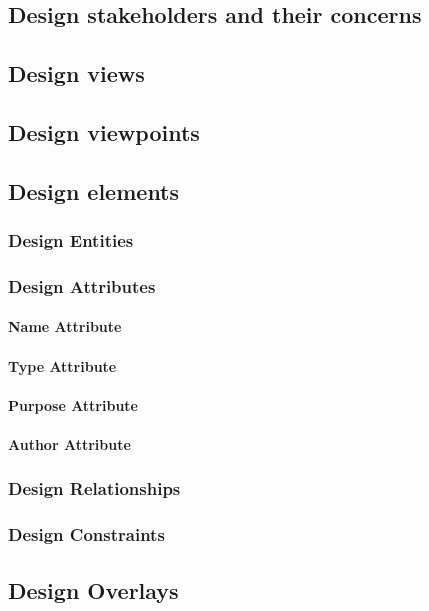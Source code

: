 \documentclass[letterpaper,10pt,titlepage,draftclsnofoot,onecolumn,onesided] {IEEEtran}
\begin{document}
\subsection{Design stakeholders and their concerns}

\subsection{Design views}

\subsection{Design viewpoints}

\subsection{Design elements}
\subsubsection{Design Entities}
\subsubsection{Design Attributes}
\paragraph{Name Attribute}
\paragraph{Type Attribute}
\paragraph{Purpose Attribute}
\paragraph{Author Attribute}
\subsubsection{Design Relationships}
\subsubsection{Design Constraints}

\subsection{Design Overlays}
\end{document}
